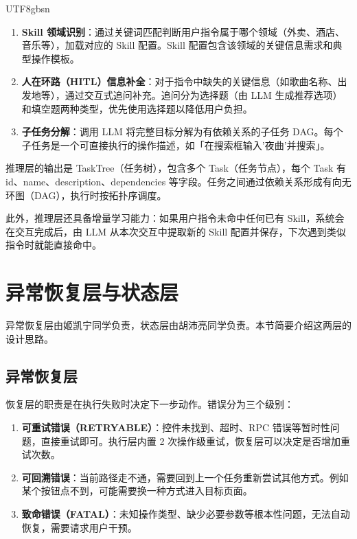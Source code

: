 \documentclass{article}
\begin{document}
\begin{CJK}{UTF8}{gbsn}
\begin{enumerate}[leftmargin=1.5em]
  \item \textbf{Skill 领域识别}：通过关键词匹配判断用户指令属于哪个领域（外卖、酒店、音乐等），加载对应的 Skill 配置。Skill 配置包含该领域的关键信息需求和典型操作模板。
  \item \textbf{人在环路（HITL）信息补全}：对于指令中缺失的关键信息（如歌曲名称、出发地等），通过交互式追问补充。追问分为选择题（由 LLM 生成推荐选项）和填空题两种类型，优先使用选择题以降低用户负担。
  \item \textbf{子任务分解}：调用 LLM 将完整目标分解为有依赖关系的子任务 DAG。每个子任务是一个可直接执行的操作描述，如「在搜索框输入'夜曲'并搜索」。
\end{enumerate}

推理层的输出是 TaskTree（任务树），包含多个 Task（任务节点），每个 Task 有 id、name、description、dependencies 等字段。任务之间通过依赖关系形成有向无环图（DAG），执行时按拓扑序调度。

此外，推理层还具备增量学习能力：如果用户指令未命中任何已有 Skill，系统会在交互完成后，由 LLM 从本次交互中提取新的 Skill 配置并保存，下次遇到类似指令时就能直接命中。

\section{异常恢复层与状态层}
\label{sec:recovery_state}

异常恢复层由姬凯宁同学负责，状态层由胡沛亮同学负责。本节简要介绍这两层的设计思路。

\subsection{异常恢复层}

恢复层的职责是在执行失败时决定下一步动作。错误分为三个级别：

\begin{enumerate}[leftmargin=1.5em]
  \item \textbf{可重试错误（RETRYABLE）}：控件未找到、超时、RPC 错误等暂时性问题，直接重试即可。执行层内置 2 次操作级重试，恢复层可以决定是否增加重试次数。
  \item \textbf{可回溯错误}：当前路径走不通，需要回到上一个任务重新尝试其他方式。例如某个按钮点不到，可能需要换一种方式进入目标页面。
  \item \textbf{致命错误（FATAL）}：未知操作类型、缺少必要参数等根本性问题，无法自动恢复，需要请求用户干预。
\end{enumerate}


\end{CJK}
\end{document}
